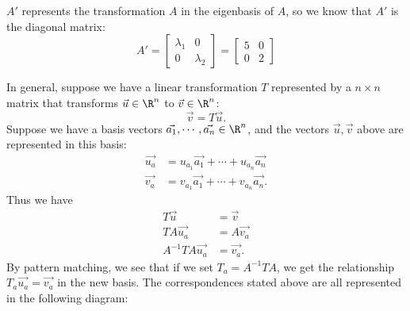 \begin{enumerate}
{    $A'$ represents the transformation $A$ in the eigenbasis of $A$, so we know that $A'$ is the diagonal matrix:
    $$ A' =
    \begin{bmatrix}
      \lambda_1 & 0 \\
      0 & \lambda_2
    \end{bmatrix} =
    \begin{bmatrix}
      5 & 0 \\
      0 & 2
    \end{bmatrix} $$

    In general, suppose we have a linear transformation $T$ represented by a $n \times n$ matrix that transforms $\vec{u} \in \R^{n}$ to $\vec{v} \in \R^{n}$:
    \[
      \vec{v} = T\vec{u}
    .\]
    Suppose we have a basis vectors $\vec{a_1}, \cdots, \vec{a_n} \in \R^{n}$, and the vectors $\vec{u}, \vec{v}$ above are represented in this basis:
    \[
      \begin{aligned}
        \vec{u_a} &= u_{a_1}\vec{a_1} + \cdots + u_{a_n}\vec{a_n} \\
        \vec{v_a} &= v_{a_1}\vec{a_1} + \cdots + v_{a_n}\vec{a_n}.
      \end{aligned}
    \]
    Thus we have
    \[
      \begin{aligned}
        T\vec{u}          &= \vec{v} \\
        TA\vec{u_a}       &= A\vec{v_a} \\
        A^{-1}TA\vec{u_a} &= \vec{v_a}.
      \end{aligned}
    \]
    By pattern matching, we see that if we set $T_a = A^{-1}TA$, we get the relationship $T_a\vec{u_a} = \vec{v_a}$ in the new basis.
    The correspondences stated above are all represented in the following diagram:

    \begin{figure}[H]
      \centering
    \end{figure}
  }




\end{enumerate}

